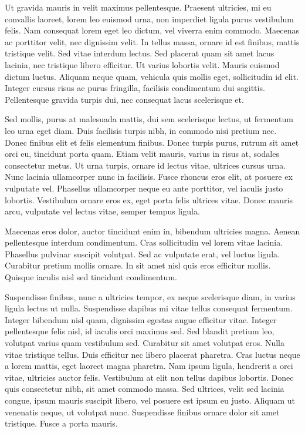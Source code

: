 Ut gravida mauris in velit maximus pellentesque. Praesent ultricies, mi eu convallis laoreet, lorem leo euismod urna, non imperdiet ligula purus vestibulum felis. Nam consequat lorem eget leo dictum, vel viverra enim commodo. Maecenas ac porttitor velit, nec dignissim velit. In tellus massa, ornare id est finibus, mattis tristique velit. Sed vitae interdum lectus. Sed placerat quam sit amet lacus lacinia, nec tristique libero efficitur. Ut varius lobortis velit. Mauris euismod dictum luctus. Aliquam neque quam, vehicula quis mollis eget, sollicitudin id elit. Integer cursus risus ac purus fringilla, facilisis condimentum dui sagittis. Pellentesque gravida turpis dui, nec consequat lacus scelerisque et.

Sed mollis, purus at malesuada mattis, dui sem scelerisque lectus, ut fermentum leo urna eget diam. Duis facilisis turpis nibh, in commodo nisi pretium nec. Donec finibus elit et felis elementum finibus. Donec turpis purus, rutrum sit amet orci eu, tincidunt porta quam. Etiam velit mauris, varius in risus at, sodales consectetur metus. Ut urna turpis, ornare id lectus vitae, ultrices cursus urna. Nunc lacinia ullamcorper nunc in facilisis. Fusce rhoncus eros elit, at posuere ex vulputate vel. Phasellus ullamcorper neque eu ante porttitor, vel iaculis justo lobortis. Vestibulum ornare eros ex, eget porta felis ultrices vitae. Donec mauris arcu, vulputate vel lectus vitae, semper tempus ligula.

Maecenas eros dolor, auctor tincidunt enim in, bibendum ultricies magna. Aenean pellentesque interdum condimentum. Cras sollicitudin vel lorem vitae lacinia. Phasellus pulvinar suscipit volutpat. Sed ac vulputate erat, vel luctus ligula. Curabitur pretium mollis ornare. In sit amet nisl quis eros efficitur mollis. Quisque iaculis nisl sed tincidunt condimentum.

Suspendisse finibus, nunc a ultricies tempor, ex neque scelerisque diam, in varius ligula lectus ut nulla. Suspendisse dapibus mi vitae tellus consequat fermentum. Integer bibendum nisl quam, dignissim egestas augue efficitur vitae. Integer pellentesque felis nisl, id iaculis orci maximus sed. Sed blandit pretium leo, volutpat varius quam vestibulum sed. Curabitur sit amet volutpat eros. Nulla vitae tristique tellus. Duis efficitur nec libero placerat pharetra. Cras luctus neque a lorem mattis, eget laoreet magna pharetra. Nam ipsum ligula, hendrerit a orci vitae, ultricies auctor felis. Vestibulum at elit non tellus dapibus lobortis. Donec quis consectetur nibh, sit amet commodo massa. Sed ultrices, velit sed lacinia congue, ipsum mauris suscipit libero, vel posuere est ipsum eu justo. Aliquam ut venenatis neque, ut volutpat nunc. Suspendisse finibus ornare dolor sit amet tristique. Fusce a porta mauris.

